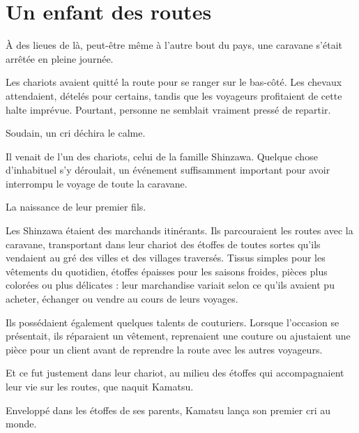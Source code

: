 \chapter{Un enfant des routes}
\label{chap:un-enfant-des-routes}

À des lieues de là, peut-être même à l'autre bout du pays, une caravane s'était
arrêtée en pleine journée.

Les chariots avaient quitté la route pour se ranger sur le bas-côté. Les
chevaux attendaient, dételés pour certains, tandis que les voyageurs
profitaient de cette halte imprévue. Pourtant, personne ne semblait vraiment
pressé de repartir.

Soudain, un cri déchira le calme.

Il venait de l'un des chariots, celui de la famille Shinzawa. Quelque chose
d'inhabituel s'y déroulait, un événement suffisamment important pour avoir
interrompu le voyage de toute la caravane.

La naissance de leur premier fils.

\scenebreak

Les Shinzawa étaient des marchands itinérants. Ils parcouraient les routes avec
la caravane, transportant dans leur chariot des étoffes de toutes sortes qu'ils
vendaient au gré des villes et des villages traversés. Tissus simples pour les
vêtements du quotidien, étoffes épaisses pour les saisons froides, pièces plus
colorées ou plus délicates : leur marchandise variait selon ce qu'ils avaient
pu acheter, échanger ou vendre au cours de leurs voyages.

Ils possédaient également quelques talents de couturiers. Lorsque l'occasion se
présentait, ils réparaient un vêtement, reprenaient une couture ou ajustaient
une pièce pour un client avant de reprendre la route avec les autres voyageurs.

Et ce fut justement dans leur chariot, au milieu des étoffes qui accompagnaient
leur vie sur les routes, que naquit Kamatsu.

Enveloppé dans les étoffes de ses parents, Kamatsu lança son premier cri au
monde.